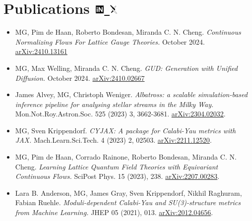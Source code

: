 \documentclass[11pt, letterpaper]{article}
\begin{document}
\section*{Publications \hfill
{ \small
\href{https://inspirehep.net/authors/2107097}{\includegraphics[height=14pt]{inspire.pdf} \hspace*{-7pt} } \hspace*{10pt}
\href{https://arxiv.org/a/gerdes_m_1.html}{\includegraphics[height=14pt]{arxiv.pdf} \hspace*{-10pt} }
}
}

\begin{itemize}[left=0pt, itemsep=5pt]
    \item {MG}, Pim de Haan, Roberto Bondesan, Miranda C. N. Cheng. \textit{Continuous Normalizing Flows For Lattice Gauge Theories.} October 2024.  \href{https://arxiv.org/abs/2410.13161}{arXiv:2410.13161}

    \item {MG}, Max Welling, Miranda C. N. Cheng. \textit{GUD: Generation with Unified Diffusion.} October 2024. \href{https://arxiv.org/abs/2410.02667}{arXiv:2410.02667}

    \item James Alvey, {MG}, Christoph Weniger. \textit{Albatross: a scalable simulation-based inference pipeline for analysing stellar streams in the Milky Way.} Mon.Not.Roy.Astron.Soc. 525 (2023) 3, 3662-3681. \href{https://arxiv.org/abs/2304.02032}{arXiv:2304.02032}.

    \item {MG}, Sven Krippendorf. \textit{CYJAX: A package for Calabi-Yau metrics with JAX.} Mach.Learn.Sci.Tech. 4 (2023) 2, 02503. \href{https://arxiv.org/abs/2211.12520}{arXiv:2211.12520}.

    \item {MG}, Pim de Haan, Corrado Rainone, Roberto Bondesan, Miranda C. N. Cheng. \textit{Learning Lattice Quantum Field Theories with Equivariant Continuous Flows.} SciPost Phys. 15 (2023), 238. \href{https://arxiv.org/abs/2207.00283}{arXiv:2207.00283}.

    \item Lara B. Anderson, {MG}, James Gray, Sven Krippendorf, Nikhil Raghuram, Fabian Ruehle. \textit{Moduli-dependent Calabi-Yau and SU(3)-structure metrics from Machine Learning.} JHEP 05 (2021), 013. \href{https://arxiv.org/abs/2012.04656}{arXiv:2012.04656}.
\end{itemize}
\end{document}
